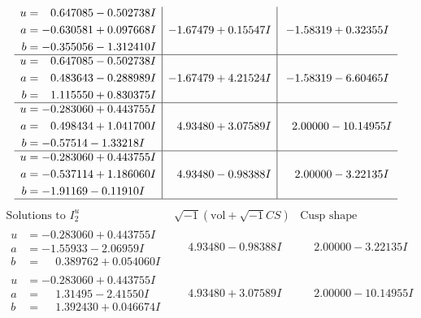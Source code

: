 \documentclass[1p]{elsarticle_modified}
\theoremstyle{definition}
\newcommand{\I}{\sqrt{-1}}
\begin{document}
$$\begin{array}{c|c|c}
\begin{aligned}
u &= \phantom{-}0.647085 - 0.502738 I \\
a &= -0.630581 + 0.097668 I \\
b &= -0.355056 - 1.312410 I\end{aligned}
 & -1.67479 + 0.15547 I & -1.58319 + 0.32355 I \\ \hline\begin{aligned}
u &= \phantom{-}0.647085 - 0.502738 I \\
a &= \phantom{-}0.483643 - 0.288989 I \\
b &= \phantom{-}1.115550 + 0.830375 I\end{aligned}
 & -1.67479 + 4.21524 I & -1.58319 - 6.60465 I \\ \hline\begin{aligned}
u &= -0.283060 + 0.443755 I \\
a &= \phantom{-}0.498434 + 1.041700 I \\
b &= -0.57514 - 1.33218 I\end{aligned}
 & \phantom{-}4.93480 + 3.07589 I & \phantom{-}2.00000 - 10.14955 I \\ \hline\begin{aligned}
u &= -0.283060 + 0.443755 I \\
a &= -0.537114 + 1.186060 I \\
b &= -1.91169 - 0.11910 I\end{aligned}
 & \phantom{-}4.93480 - 0.98388 I & \phantom{-}2.00000 - 3.22135 I\\
 \hline 
 \end{array}$$\newpage$$\begin{array}{c|c|c}  
\text{Solutions to }I^u_{2}& \I (\text{vol} + \sqrt{-1}CS) & \text{Cusp shape}\\
 \hline 
\begin{aligned}
u &= -0.283060 + 0.443755 I \\
a &= -1.55933 - 2.06959 I \\
b &= \phantom{-}0.389762 + 0.054060 I\end{aligned}
 & \phantom{-}4.93480 - 0.98388 I & \phantom{-}2.00000 - 3.22135 I \\ \hline\begin{aligned}
u &= -0.283060 + 0.443755 I \\
a &= \phantom{-}1.31495 - 2.41550 I \\
b &= \phantom{-}1.392430 + 0.046674 I\end{aligned}
 & \phantom{-}4.93480 + 3.07589 I & \phantom{-}2.00000 - 10.14955 I \\ \hline\begin{aligned}

\end{aligned}
\end{array}$$
\end{document}
